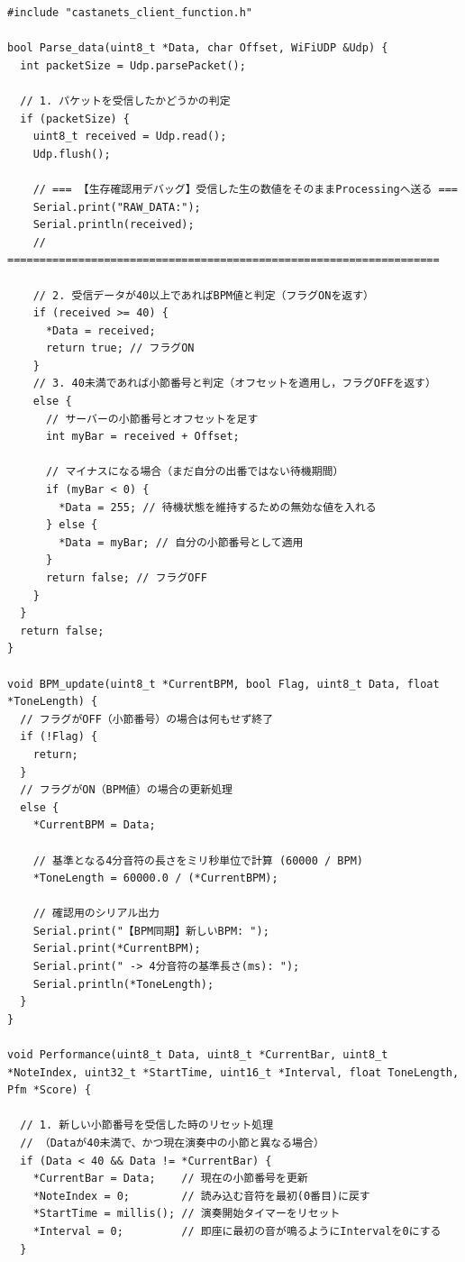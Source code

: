 \begin{lstlisting}
#include "castanets_client_function.h"

bool Parse_data(uint8_t *Data, char Offset, WiFiUDP &Udp) {
  int packetSize = Udp.parsePacket();
  
  // 1. パケットを受信したかどうかの判定
  if (packetSize) {
    uint8_t received = Udp.read();
    Udp.flush();

    // === 【生存確認用デバッグ】受信した生の数値をそのままProcessingへ送る ===
    Serial.print("RAW_DATA:");
    Serial.println(received);
    // ===================================================================
    
    // 2. 受信データが40以上であればBPM値と判定（フラグONを返す）
    if (received >= 40) {
      *Data = received;
      return true; // フラグON
    }
    // 3. 40未満であれば小節番号と判定（オフセットを適用し，フラグOFFを返す）
    else {
      // サーバーの小節番号とオフセットを足す
      int myBar = received + Offset; 
      
      // マイナスになる場合（まだ自分の出番ではない待機期間）
      if (myBar < 0) {
        *Data = 255; // 待機状態を維持するための無効な値を入れる
      } else {
        *Data = myBar; // 自分の小節番号として適用
      }
      return false; // フラグOFF
    }
  }
  return false;
}

void BPM_update(uint8_t *CurrentBPM, bool Flag, uint8_t Data, float *ToneLength) {
  // フラグがOFF（小節番号）の場合は何もせず終了
  if (!Flag) {
    return;
  } 
  // フラグがON（BPM値）の場合の更新処理
  else {
    *CurrentBPM = Data;
    
    // 基準となる4分音符の長さをミリ秒単位で計算 (60000 / BPM)
    *ToneLength = 60000.0 / (*CurrentBPM);
    
    // 確認用のシリアル出力
    Serial.print("【BPM同期】新しいBPM: ");
    Serial.print(*CurrentBPM);
    Serial.print(" -> 4分音符の基準長さ(ms): ");
    Serial.println(*ToneLength);
  }
}

void Performance(uint8_t Data, uint8_t *CurrentBar, uint8_t *NoteIndex, uint32_t *StartTime, uint16_t *Interval, float ToneLength, Pfm *Score) {
  
  // 1. 新しい小節番号を受信した時のリセット処理
  // （Dataが40未満で、かつ現在演奏中の小節と異なる場合）
  if (Data < 40 && Data != *CurrentBar) {
    *CurrentBar = Data;    // 現在の小節番号を更新
    *NoteIndex = 0;        // 読み込む音符を最初(0番目)に戻す
    *StartTime = millis(); // 演奏開始タイマーをリセット
    *Interval = 0;         // 即座に最初の音が鳴るようにIntervalを0にする
  }


\end{lstlisting}

